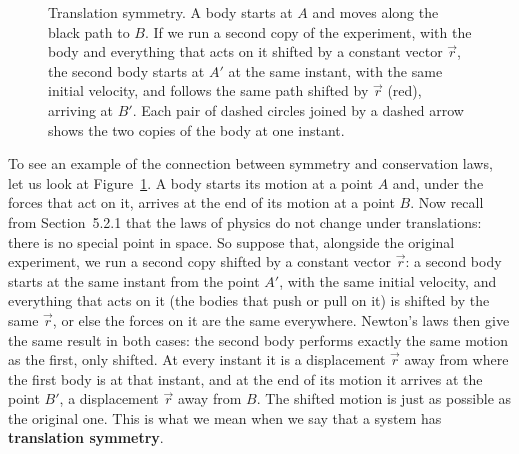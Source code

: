 \documentclass[11pt,a4paper]{article}
\begin{document}
\begin{figure}[ht]
\centering
\begin{minipage}[c]{0.34\textwidth}
\centering
{}
\end{minipage}\hfill
\begin{minipage}[c]{0.62\textwidth}
\caption{Translation symmetry. A body starts at $A$ and moves along the black path to $B$. If we
run a second copy of the experiment, with the body and everything that acts on it shifted by a
constant vector $\vec{r}$, the second body starts at $A'$ at the same instant, with the same initial
velocity, and follows the same path shifted by $\vec{r}$ (red), arriving at $B'$. Each pair of dashed
circles joined by a dashed arrow shows the two copies of the body at one instant.}\label{fig:translation}
\end{minipage}
\end{figure}

To see an example of the connection between symmetry and conservation laws, let us look at
Figure~\ref{fig:translation}. A body starts its motion at a point $A$ and, under the forces that act
on it, arrives at the end of its motion at a point $B$. Now recall from Section~5.2.1 that the laws
of physics do not change under translations: there is no special point in space. So suppose that,
alongside the original experiment, we run a second copy shifted by a constant vector $\vec{r}$: a
second body starts at the same instant from the point $A'$, with the same initial velocity, and
everything that acts on it (the bodies that push or pull on it) is shifted by the same $\vec{r}$, or
else the forces on it are the same everywhere. Newton's laws then give the same result in both
cases: the second body performs exactly the same motion as the first, only shifted. At every instant
it is a displacement $\vec{r}$ away from where the first body is at that instant, and at the end of
its motion it arrives at the point $B'$, a displacement $\vec{r}$ away from $B$. The shifted motion is
just as possible as the original one. This is what we mean when we say that a system has \textbf{translation symmetry}.
\end{document}
